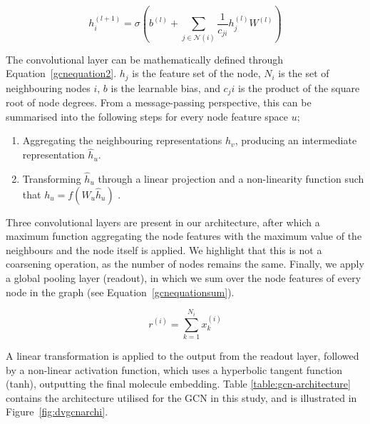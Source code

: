 \begin{equation}
    \label{gcnequation2}
    h_i^{(l+1)} = \sigma(b^{(l)} + \sum_{j\in\mathcal{N}(i)}\frac{1}{c_{ji}}h_j^{(l)}W^{(l)})
\end{equation}

The convolutional layer can be mathematically defined through Equation~\ref{gcnequation2}. $h_j$ is the feature set of the node, $N_i$ is the set of neighbouring nodes $i$, $b$ is the learnable bias, and $c_ji$ is the product of the square root of node degrees. From a message-passing perspective, this can be summarised into the following steps for every node feature space $u$;

\begin{enumerate}
    \item Aggregating the neighbouring representations $h_v$, producing an intermediate representation $\hat{h}_u$.
    \item Transforming $\hat{h}_u$ through a linear projection and a non-linearity function such that $h_u = f(W_u \hat{h}_u)$ \citep{kipf2016semi}.
\end{enumerate}

Three convolutional layers are present in our architecture, after which a maximum function aggregating the node features with the maximum value of the neighbours and the node itself is applied. We highlight that this is not a coarsening operation, as the number of nodes remains the same. Finally, we apply a global pooling layer (readout), in which we sum over the node features of every node in the graph (see Equation~\ref{gcnequationsum}). 

\begin{equation}
    \label{gcnequationsum}
    r^{(i)} = \sum_{k=1}^{N_i} x^{(i)}_k
\end{equation}

A linear transformation is applied to the output from the readout layer, followed by a non-linear activation function, which uses a hyperbolic tangent function (tanh), outputting the final molecule embedding. Table \ref{table:gcn-architecture} contains the architecture utilised for the GCN in this study, and is illustrated in Figure~\ref{fig:dvgcnarchi}.

